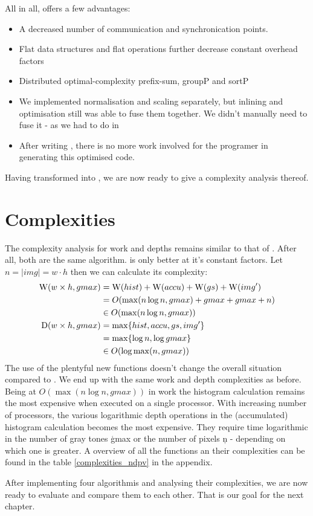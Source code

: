   All in all, \ndpv offers a few advantages:
  \begin{itemize}
    \item A decreased number of communication and synchronication points.
    \item Flat data structures and flat operations further decrease constant overhead factors 
    \item Distributed optimal-complexity prefix-sum, groupP and sortP
    \item We implemented normalisation and scaling separately, but inlining
            and optimisation still was able to fuse them together. We didn't
            manually need to fuse it - as we had to do in \man
    \item After writing \ndpn, there is no more work involved for the programer in generating this optimised code.
  \end{itemize}
  Having transformed \ndpn into \ndpv, we are now ready to give a complexity analysis thereof.
  
\section{Complexities}
  The complexity analysis for work and depths remains similar to that of \ndpn.
  After all, both are the same algorithm. \ndpv is only better at it's constant factors.
  Let $n = |img| = w\cdot h$ then we can calculate its complexity:
  \begin{equation*}
  \begin{split}
  \W(w \times h,gmax)
        & = \W(hist) + \W(accu) + \W(gs) + \comment{\W(expandPS) +} \W(img') \\
        & = O( \max(n \log n, gmax) + gmax + gmax \comment{ + 1} + n) \\
        & \in O(\max(n \log n, gmax)) \\
  \D(w \times h,gmax)
      & = \max \{ hist, accu, gs\comment{, expandPS}, img'\} \\
      & = \max \{\log n, \log gmax \} \\
      & \in O(\log \max(n,gmax)) \\
  \end{split}
  \end{equation*}
  The use of the plentyful new functions doesn't change the overall situation compared to \ndpn.
  We end up with the same work and depth complexities as before. Being at $O(\max(n \log n,gmax))$ in work
  the histogram calculation remains the most expensive when executed on a single processor.
  With increasing number of processors, the various logarithmic depth
  operations in the (accumulated) histogram calculation becomes the most expensive.
  They require time logarithmic in the number of gray tones \c{gmax} or the number
  of pixels \c{n} - depending on which one is greater.
  A overview of all the functions an their complexities can be found in the table \ref{complexities_ndpv} in the appendix.
  
  After implementing four algorithmis and analysing their complexities, we are now ready
  to evaluate and compare them to each other. That is our goal for the next chapter.
  
  
  
  
